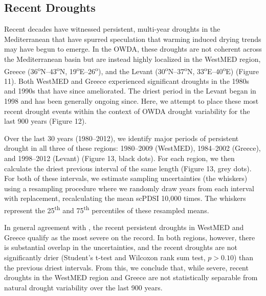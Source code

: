 \documentclass[draft,jgr]{AGUTeX}
\begin{document}
\begin{article}
\subsection{Recent Droughts}
\noindent Recent decades have witnessed persistent, multi-year droughts in the Mediterranean that have spurred speculation that warming induced drying trends may have begun to emerge. In the OWDA, these droughts are not coherent across the Mediterranean basin but are instead highly localized in the WestMED region, Greece (36\textsuperscript{o}N--43\textsuperscript{o}N, 19\textsuperscript{o}E--26\textsuperscript{o}), and the Levant (30\textsuperscript{o}N--37\textsuperscript{o}N, 33\textsuperscript{o}E--40\textsuperscript{o}E) (Figure 11). Both WestMED and Greece experienced significant droughts in the 1980s and 1990s that have since ameliorated. The driest period in the Levant began in 1998 and has been generally ongoing since. Here, we attempt to place these most recent drought events within the context of OWDA drought variability for the last 900 years (Figure 12).

\indent Over the last 30 years (1980--2012), we identify major periods of persistent drought in all three of these regions: 1980--2009 (WestMED), 1984--2002 (Greece), and 1998--2012 (Levant) (Figure 13, black dots). For each region, we then calculate the driest previous interval of the same length (Figure 13, grey dots). For both of these intervals, we estimate sampling uncertainties (the whiskers) using a resampling procedure where we randomly draw years from each interval with replacement, recalculating the mean scPDSI 10,000 times. The whiskers represent the 25\textsuperscript{th} and 75\textsuperscript{th} percentiles of these resampled means.

\indent In general agreement with \citet{Touchan:etal2008a}, the recent persistent droughts in WestMED and Greece qualify as the most severe on the record. In both regions, however, there is substantial overlap in the uncertainties, and the recent droughts are not significantly drier (Student's t-test and Wilcoxon rank sum test, $p>0.10$) than the previous driest intervals. From this, we conclude that, while severe, recent droughts in the WestMED region and Greece are not statistically separable from natural drought variability over the last 900 years.


\end{article}
\end{document}
